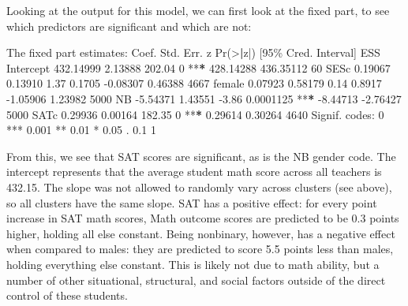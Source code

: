 \documentclass[
]{book}
\newenvironment{Shaded}{\begin{snugshade}}{\end{snugshade}}
\newcommand{\DecValTok}[1]{\textcolor[rgb]{0.00,0.00,0.81}{#1}}
\newcommand{\ErrorTok}[1]{\textcolor[rgb]{0.64,0.00,0.00}{\textbf{#1}}}
\newcommand{\FloatTok}[1]{\textcolor[rgb]{0.00,0.00,0.81}{#1}}
\newcommand{\FunctionTok}[1]{\textcolor[rgb]{0.00,0.00,0.00}{#1}}
\newcommand{\NormalTok}[1]{#1}
\newcommand{\SpecialCharTok}[1]{\textcolor[rgb]{0.00,0.00,0.00}{#1}}
\newcommand{\StringTok}[1]{\textcolor[rgb]{0.31,0.60,0.02}{#1}}
\begin{document}
Looking at the output for this model, we can first look at the fixed part, to see which predictors are significant and which are not:

\begin{Shaded}
\begin{Highlighting}[]
\NormalTok{The fixed part estimates}\SpecialCharTok{:}  
\NormalTok{                Coef.   Std. Err.       z    }\FunctionTok{Pr}\NormalTok{(}\SpecialCharTok{\textgreater{}}\ErrorTok{|}\NormalTok{z}\SpecialCharTok{|}\NormalTok{)       [}\DecValTok{95}\NormalTok{\% Cred.   Interval]    ESS }
\NormalTok{Intercept   }\FloatTok{432.14999}     \FloatTok{2.13888}  \FloatTok{202.04}           \DecValTok{0}  \SpecialCharTok{**}\ErrorTok{*}   \FloatTok{428.14288}   \FloatTok{436.35112}     \DecValTok{60} 
\NormalTok{SESc          }\FloatTok{0.19067}     \FloatTok{0.13910}    \FloatTok{1.37}      \FloatTok{0.1705}         \SpecialCharTok{{-}}\FloatTok{0.08307}     \FloatTok{0.46388}   \DecValTok{4667} 
\NormalTok{female        }\FloatTok{0.07923}     \FloatTok{0.58179}    \FloatTok{0.14}      \FloatTok{0.8917}         \SpecialCharTok{{-}}\FloatTok{1.05906}     \FloatTok{1.23982}   \DecValTok{5000} 
\NormalTok{NB           }\SpecialCharTok{{-}}\FloatTok{5.54371}     \FloatTok{1.43551}   \SpecialCharTok{{-}}\FloatTok{3.86}   \FloatTok{0.0001125}  \SpecialCharTok{**}\ErrorTok{*}    \SpecialCharTok{{-}}\FloatTok{8.44713}    \SpecialCharTok{{-}}\FloatTok{2.76427}   \DecValTok{5000} 
\NormalTok{SATc          }\FloatTok{0.29936}     \FloatTok{0.00164}  \FloatTok{182.35}           \DecValTok{0}  \SpecialCharTok{**}\ErrorTok{*}     \FloatTok{0.29614}     \FloatTok{0.30264}   \DecValTok{4640} 
\NormalTok{Signif. codes}\SpecialCharTok{:}  \DecValTok{0} \StringTok{\textquotesingle{}***\textquotesingle{}} \FloatTok{0.001} \StringTok{\textquotesingle{}**\textquotesingle{}} \FloatTok{0.01} \StringTok{\textquotesingle{}*\textquotesingle{}} \FloatTok{0.05} \StringTok{\textquotesingle{}.\textquotesingle{}} \FloatTok{0.1} \StringTok{\textquotesingle{} \textquotesingle{}} \DecValTok{1}  
\end{Highlighting}
\end{Shaded}

From this, we see that SAT scores are significant, as is the NB gender code. The intercept represents that the average student math score across all teachers is 432.15. The slope was not allowed to randomly vary across clusters (see above), so all clusters have the same slope. SAT has a positive effect: for every point increase in SAT math scores, Math outcome scores are predicted to be 0.3 points higher, holding all else constant. Being nonbinary, however, has a negative effect when compared to males: they are predicted to score 5.5 points less than males, holding everything else constant. This is likely not due to math ability, but a number of other situational, structural, and social factors outside of the direct control of these students.
\end{document}
